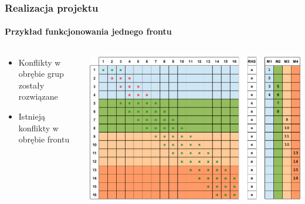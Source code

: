 \documentclass[12pt,handout]{beamer}
\begin{document}
\begin{frame}
\frametitle{Realizacja projektu}
\framesubtitle{Przykład funkcjonowania jednego frontu}
\begin{columns}[t] %
     \begin{column}[T]{5cm} %
     \begin{itemize}
		\item Konflikty w obrębie grup zostały rozwiązane
		\item\alert Istnieją konflikty w obrębie frontu
     \end{itemize}
     \end{column}
     \begin{column}[T]{7cm} %
		\includegraphics[scale=0.3]{frame1.jpg}
     \end{column}
     \end{columns}
\end{frame}
\end{document}
